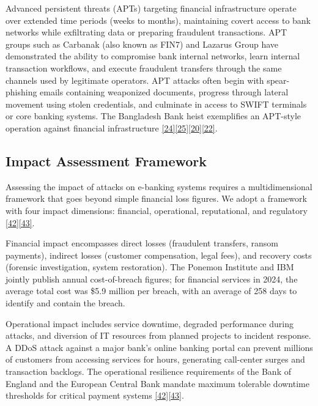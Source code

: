 \indent Advanced persistent threats (APTs) targeting financial infrastructure operate over extended time periods (weeks to months), maintaining covert access to bank networks while exfiltrating data or preparing fraudulent transactions. APT groups such as Carbanak (also known as FIN7) and Lazarus Group have demonstrated the ability to compromise bank internal networks, learn internal transaction workflows, and execute fraudulent transfers through the same channels used by legitimate operators. APT attacks often begin with spear-phishing emails containing weaponized documents, progress through lateral movement using stolen credentials, and culminate in access to SWIFT terminals or core banking systems. The Bangladesh Bank heist exemplifies an APT-style operation against financial infrastructure \hyperref[ref:24]{[24]}\hyperref[ref:25]{[25]}\hyperref[ref:20]{[20]}\hyperref[ref:22]{[22]}.

\subsection{Impact Assessment Framework}

\indent Assessing the impact of attacks on e-banking systems requires a multidimensional framework that goes beyond simple financial loss figures. We adopt a framework with four impact dimensions: financial, operational, reputational, and regulatory \hyperref[ref:42]{[42]}\hyperref[ref:43]{[43]}.

\indent Financial impact encompasses direct losses (fraudulent transfers, ransom payments), indirect losses (customer compensation, legal fees), and recovery costs (forensic investigation, system restoration). The Ponemon Institute and IBM jointly publish annual cost-of-breach figures; for financial services in 2024, the average total cost was \$5.9 million per breach, with an average of 258 days to identify and contain the breach.

\indent Operational impact includes service downtime, degraded performance during attacks, and diversion of IT resources from planned projects to incident response. A DDoS attack against a major bank's online banking portal can prevent millions of customers from accessing services for hours, generating call-center surges and transaction backlogs. The operational resilience requirements of the Bank of England and the European Central Bank mandate maximum tolerable downtime thresholds for critical payment systems \hyperref[ref:42]{[42]}\hyperref[ref:43]{[43]}.

